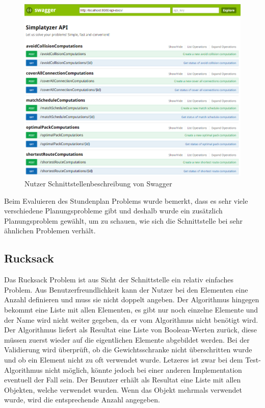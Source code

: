 \begin{figure}[h]
\centering
\includegraphics[scale=0.5]{images/swagger_api.png}
\caption[Nutzer Schnittstellenbeschreibung von Swagger]{Nutzer Schnittstellenbeschreibung von Swagger \selfmade{}}
\label{fig:swagger}
\end{figure}

\FloatBarrier

Beim Evaluieren des Stundenplan Problems wurde bemerkt, dass es sehr viele verschiedene Planungsprobleme gibt und deshalb wurde ein zusätzlich Planungsproblem gewählt, 
um zu schauen, wie sich die Schnittstelle bei sehr ähnlichen Problemen verhält.

%
%
%
%

\subsection{Rucksack}
Das Rucksack Problem ist aus Sicht der Schnittstelle ein relativ einfaches Problem. Aus Benutzerfreundlichkeit kann der Nutzer bei den Elementen eine Anzahl definieren und muss sie nicht 
doppelt angeben. Der Algorithmus hingegen bekommt eine Liste mit allen Elementen, es gibt nur noch einzelne Elemente und der Name wird nicht weiter gegeben, da er vom Algorithmus nicht 
benötigt wird. Der Algorithmus liefert als Resultat eine Liste von Boolean-Werten zurück, diese müssen zuerst wieder auf die eigentlichen Elemente abgebildet werden. Bei der Validierung wird 
überprüft, ob die Gewichtsschranke nicht überschritten wurde und ob ein Element nicht zu oft verwendet wurde. Letzeres ist zwar bei dem Test-Algorithmus nicht möglich, könnte jedoch bei 
einer anderen Implementation eventuell der Fall sein. Der Benutzer erhält als Resultat eine Liste mit allen Objekten, welche verwendet wurden. Wenn das Objekt mehrmals verwendet wurde, 
wird die entsprechende Anzahl angegeben.

